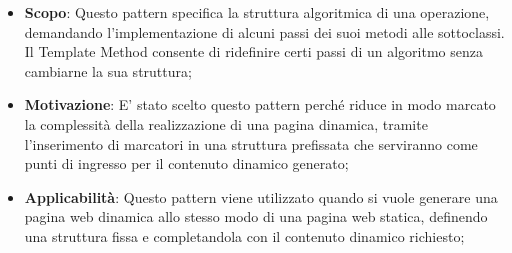 		
		\begin{itemize}
			\item \textbf{Scopo}: Questo pattern specifica la struttura algoritmica di una operazione, demandando l'implementazione di alcuni passi dei suoi metodi alle sottoclassi. Il Template Method consente di ridefinire certi passi di un algoritmo senza cambiarne la sua struttura;
			
			\item \textbf{Motivazione}: E' stato scelto questo pattern perché riduce in modo marcato la complessità della realizzazione di una pagina dinamica, tramite l'inserimento di marcatori in una struttura prefissata che serviranno come punti di ingresso per il contenuto dinamico generato;
			
			\item \textbf{Applicabilità}: Questo pattern viene utilizzato quando si vuole generare una pagina web dinamica allo stesso modo di una pagina web statica, definendo una struttura fissa e completandola con il contenuto dinamico richiesto;
			
		\end{itemize}



